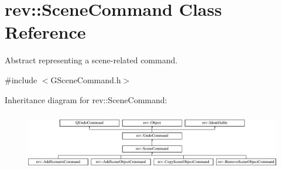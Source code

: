 \hypertarget{classrev_1_1_scene_command}{}\section{rev\+::Scene\+Command Class Reference}
\label{classrev_1_1_scene_command}


Abstract representing a scene-\/related command.  




{\ttfamily \#include $<$G\+Scene\+Command.\+h$>$}

Inheritance diagram for rev\+::Scene\+Command\+:\begin{figure}[H]
\begin{center}
\leavevmode
\includegraphics[height=2.568807cm]{classrev_1_1_scene_command}
\end{center}
\end{figure}
